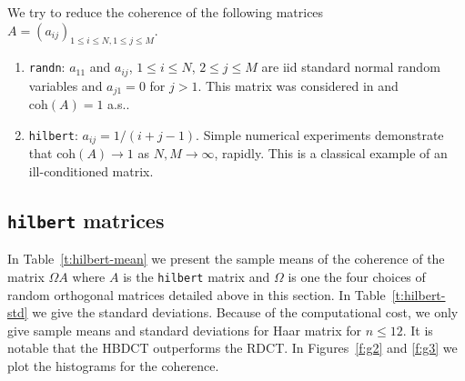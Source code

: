 \documentclass{amsart}
\theoremstyle{definition}
\theoremstyle{remark}
\numberwithin{equation}{section}
\begin{document}
We try to reduce the coherence of the following matrices $A = (a_{ij})_{1 \leq i \leq N, 1 \leq j \leq M}$.
\begin{enumerate}
\item {\tt randn}: $a_{11}$ and $a_{ij}$, $1 \leq i \leq N$, $2 \leq j \leq M$ are iid standard normal random variables and $a_{j1} = 0$ for $j > 1$.  This matrix was considered in \cite{Avron2010} and $\mathrm{coh}(A) = 1$ a.s..
\item {\tt hilbert}: $a_{ij} = 1/(i + j -1)$.  Simple numerical experiments  demonstrate that $\mathrm{coh}(A) \to 1$ as $N, M \to \infty$, rapidly.  This is a classical example of an ill-conditioned matrix.
\end{enumerate}



\subsection{{\tt hilbert} matrices}

In Table~\ref{t:hilbert-mean} we present the sample means of the coherence of the matrix $\Omega A$ where $A$ is the {\tt hilbert} matrix and $\Omega$ is one the four choices of random orthogonal matrices detailed above in this section.  In Table~\ref{t:hilbert-std} we give the standard deviations.  Because of the computational cost, we only give sample means and standard deviations for Haar matrix for $n \leq 12$. It is notable that the HBDCT outperforms the RDCT.  In Figures~\ref{f:g2} and \ref{f:g3} we plot the histograms for the coherence.
\end{document}
